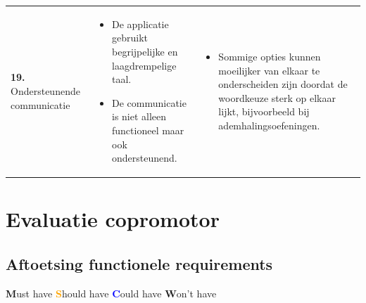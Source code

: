 {\begin{longtable}{
            >{\raggedright\arraybackslash}p{5.23cm}
            >{\raggedright\arraybackslash}p{4.93cm}
            >{\raggedright\arraybackslash}p{4.93cm}
        }
        \textbf{19.} Ondersteunende communicatie 
        &  
        \begin{itemize}[nosep,leftmargin=*,itemsep=10pt] 
            \renewcommand{\labelitemi}{+} 
            \item De applicatie gebruikt begrijpelijke en laagdrempelige taal.
            \item De communicatie is niet alleen functioneel maar ook ondersteunend.
        \end{itemize} 
        &
        \begin{itemize}[nosep,leftmargin=*,itemsep=10pt] 
            \renewcommand{\labelitemi}{-} 
            \item Sommige opties kunnen moeilijker van elkaar te onderscheiden zijn doordat de woordkeuze sterk op elkaar lijkt, bijvoorbeeld bij ademhalingsoefeningen.
        \end{itemize} 
        \\ 
    \end{longtable}
}

\newpage

\section{Evaluatie copromotor}
\label{sec:copromotor-evaluatie}

\subsection{Aftoetsing functionele requirements}
\label{subsec:frs-burnoutfreev2-expert}

\vspace{1em}

{\small
    \textcolor{green!80!black}{\textbf{M}}ust have \quad
    \textcolor{orange}{\textbf{S}}hould have \quad
    \textcolor{blue}{\textbf{C}}ould have \quad
    \textcolor{black!60}{\textbf{W}}on’t have
}

